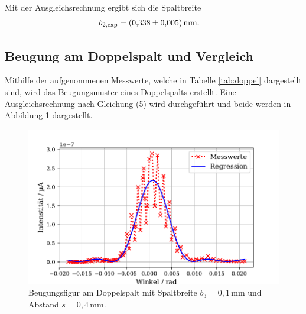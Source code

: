 \noindent Mit der Ausgleichsrechnung ergibt sich die Spaltbreite
\begin{align*}
b_\text{2,exp} &= (\num{0.338 +- 0.005}) \,\si{\milli\meter}.
\end{align*}

\subsection{Beugung am Doppelspalt und Vergleich}
Mithilfe der aufgenommenen Messwerte, welche in Tabelle \ref{tab:doppel} dargestellt sind,
wird das Beugungsmuster eines Doppelspalts erstellt. Eine Ausgleichsrechnung nach Gleichung (5)
wird durchgeführt und beide werden in Abbildung \ref{fig:doppel} dargestellt.

\begin{figure}[H]
  \center
  \includegraphics[scale = 0.75]{doppel.pdf}
  \caption{Beugungsfigur am Doppelspalt mit Spaltbreite $b_3 = 0,1\,\si{\milli\meter}$ und Abstand $s = 0,4\,\si{\milli\meter}$.}
  \label{fig:doppel}
\end{figure}

